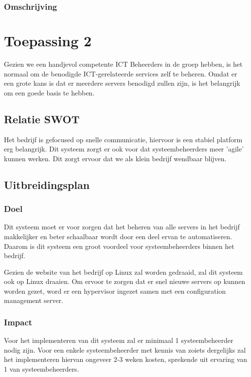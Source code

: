 \subsubsection{Omschrijving}

\section{Toepassing 2}

Gezien we een handjevol competente ICT Beheerders in de groep hebben,
is het normaal om de benodigde ICT-gerelateerde services zelf te beheren.
Omdat er een grote kans is dat er meerdere servers benodigd zullen zijn,
is het belangrijk om een goede basis te hebben.

\subsection{Relatie SWOT}

Het bedrijf is gefocused op snelle communicatie,
hiervoor is een stabiel platform erg belangrijk.
Dit systeem zorgt er ook voor dat systeembeheerders meer 'agile' kunnen werken.
Dit zorgt ervoor dat we als klein bedrijf wendbaar blijven.

\subsection{Uitbreidingsplan}

\subsubsection{Doel}

Dit systeem moet er voor zorgen dat het beheren van alle servers in het bedrijf
makkelijker en beter schaalbaar wordt door een deel ervan te automatiseren.
Daarom is dit systeem een groot voordeel voor systeembeheerders binnen het bedrijf.

Gezien de website van het bedrijf op Linux zal worden gedraaid,
zal dit systeem ook op Linux draaien.
Om ervoor te zorgen dat er snel nieuwe servers op kunnen worden gezet,
word er een hypervisor ingezet samen met een configuration management server.

\subsubsection{Impact}

Voor het implementeren van dit systeem zal er minimaal 1 systeembeheerder nodig zijn.
Voor een enkele systeembeheerder met kennis van zoiets dergelijks
zal het implementeren hiervan ongeveer 2-3 weken kosten, sprekende uit ervaring
van 1 van systeembeheerders.

